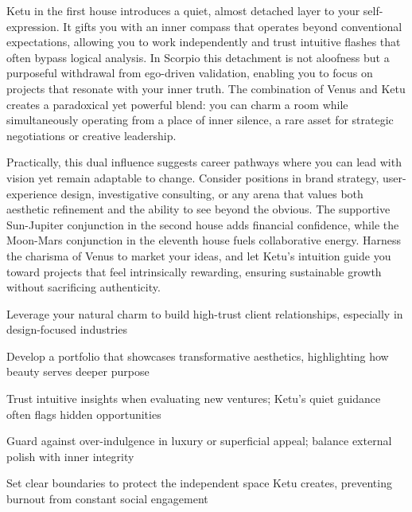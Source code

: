 {\fontsize{9}{13}\selectfont Ketu in the first house introduces a quiet, almost detached layer to your self-expression. It gifts you with an inner compass that operates beyond conventional expectations, allowing you to work independently and trust intuitive flashes that often bypass logical analysis. In Scorpio this detachment is not aloofness but a purposeful withdrawal from ego-driven validation, enabling you to focus on projects that resonate with your inner truth. The combination of Venus and Ketu creates a paradoxical yet powerful blend: you can charm a room while simultaneously operating from a place of inner silence, a rare asset for strategic negotiations or creative leadership.}\par\vspace{1.8mm}

{\fontsize{9}{13}\selectfont Practically, this dual influence suggests career pathways where you can lead with vision yet remain adaptable to change. Consider positions in brand strategy, user-experience design, investigative consulting, or any arena that values both aesthetic refinement and the ability to see beyond the obvious. The supportive Sun-Jupiter conjunction in the second house adds financial confidence, while the Moon-Mars conjunction in the eleventh house fuels collaborative energy. Harness the charisma of Venus to market your ideas, and let Ketu's intuition guide you toward projects that feel intrinsically rewarding, ensuring sustainable growth without sacrificing authenticity.}\par\vspace{1.8mm}

\begin{diamondlist}
  \item {\fontsize{8.5}{12}\selectfont Leverage your natural charm to build high-trust client relationships, especially in design-focused industries}
  \item {\fontsize{8.5}{12}\selectfont Develop a portfolio that showcases transformative aesthetics, highlighting how beauty serves deeper purpose}
  \item {\fontsize{8.5}{12}\selectfont Trust intuitive insights when evaluating new ventures; Ketu's quiet guidance often flags hidden opportunities}
  \item {\fontsize{8.5}{12}\selectfont Guard against over-indulgence in luxury or superficial appeal; balance external polish with inner integrity}
  \item {\fontsize{8.5}{12}\selectfont Set clear boundaries to protect the independent space Ketu creates, preventing burnout from constant social engagement}
\end{diamondlist}

